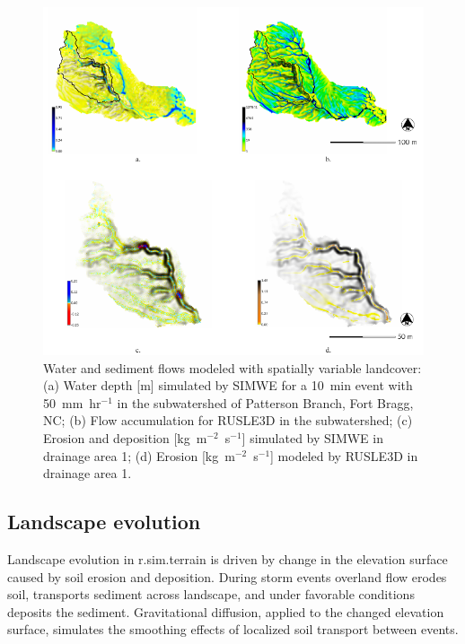 \documentclass[gmd, manuscript]{copernicus}
\begin{document}
\begin{figure}
\center
\includegraphics[width=\textwidth,height=0.95\textheight,keepaspectratio]{figures/models.pdf}
\caption{Water and sediment flows modeled with spatially variable landcover:
(a) Water depth [m] simulated by SIMWE for a 10~\unit{min} event with 50~\unit{mm~hr}$^{-1}$ in the subwatershed
of Patterson Branch, Fort Bragg, NC;
(b) Flow accumulation for RUSLE3D in the subwatershed;
(c) Erosion and deposition [\unit{kg~m}$^{-2}$~\unit{s}$^{-1}$] simulated by SIMWE in drainage area 1;
(d) Erosion [\unit{kg~m}$^{-2}$~\unit{s}$^{-1}$] modeled by RUSLE3D in drainage area 1.
}
\label{fig:models}
\end{figure}


\subsection{Landscape evolution}

Landscape evolution in r.sim.terrain 
is driven by change in the elevation surface 
caused by soil erosion and deposition.
During storm events overland flow erodes soil, 
transports sediment across landscape, and 
under favorable conditions deposits the sediment. 
Gravitational diffusion, 
applied to the changed elevation surface, 
simulates the smoothing effects 
of localized soil transport between events.
\end{document}
